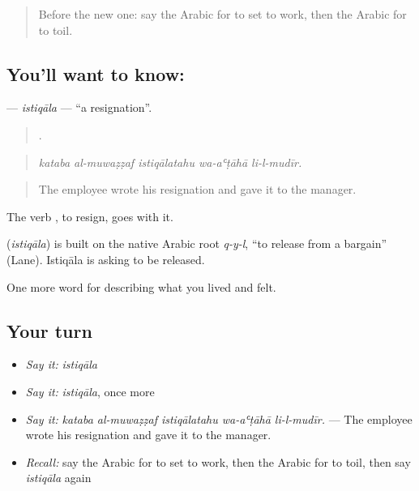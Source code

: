 \label{lesson:AR-C522-istiqala}



\begin{quote}
Before the new one: say the Arabic for to set to work, then the Arabic for to toil.
\end{quote}

\subsection*{You'll want to know: }
\textbf{} — \emph{istiqāla} — \textquotedblleft{}a resignation\textquotedblright{}.

\begin{quote}
    .
\end{quote}

\begin{quote}
\emph{kataba al-muwaẓẓaf istiqālatahu wa-aʿṭāhā li-l-mudīr.}
\end{quote}

\begin{quote}
The employee wrote his resignation and gave it to the manager.
\end{quote}

The verb , to resign, goes with it.

\begin{cousinweb}
\textbf{} (\emph{istiqāla}) is built on the native Arabic root \emph{q-y-l}, \textquotedblleft{}to release from a bargain\textquotedblright{} (Lane). Istiqāla is asking to be released.
\end{cousinweb}

\begin{grammarlens}[title={What you've built}]
One more word for describing what you lived and felt.
\end{grammarlens}

\subsection*{Your turn}
\begin{itemize}
\raggedright
  \item \emph{Say it:} \emph{istiqāla}
  \item \emph{Say it:} \emph{istiqāla}, once more
  \item \emph{Say it:} \emph{kataba al-muwaẓẓaf istiqālatahu wa-aʿṭāhā li-l-mudīr.} — The employee wrote his resignation and gave it to the manager.
  \item \emph{Recall:} say the Arabic for to set to work, then the Arabic for to toil, then say \emph{istiqāla} again
\end{itemize}

